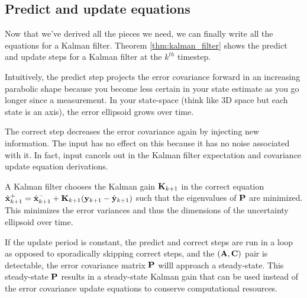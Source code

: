 \subsection{Predict and update equations}

Now that we've derived all the pieces we need, we can finally write all the
equations for a Kalman filter. Theorem \ref{thm:kalman_filter} shows the predict
and update steps for a Kalman filter at the $k^{th}$ timestep.

Intuitively, the predict step projects the error covariance forward in an
increasing parabolic shape because you become less certain in your state
estimate as you go longer since a measurement. In your state-space (think like
3D space but each state is an axis), the error ellipsoid grows over time.

The correct step decreases the error covariance again by injecting new
information. The input has no effect on this because it has no noise associated
with it. In fact, input cancels out in the Kalman filter expectation and
covariance update equation derivations.

A Kalman filter chooses the Kalman gain $\mathbf{K}_{k+1}$ in the correct equation
$\hat{\mathbf{x}}_{k+1}^+ = \hat{\mathbf{x}}_{k+1}^- + \mathbf{K}_{k+1}(\mathbf{y}_{k+1} -
\hat{\mathbf{y}}_{k+1})$ such that the eigenvalues of $\mathbf{P}$ are minimized. This
minimizes the error variances and thus the dimensions of the uncertainty
ellipsoid over time.

If the update period is constant, the predict and correct steps are run in a
loop as opposed to sporadically skipping correct steps, and the
$(\mathbf{A}, \mathbf{C})$ pair is detectable, the error covariance matrix $\mathbf{P}$
willl approach a steady-state. This steady-state $\mathbf{P}$ results in a
steady-state Kalman gain that can be used instead of the error covariance update
equations to conserve computational resources.

